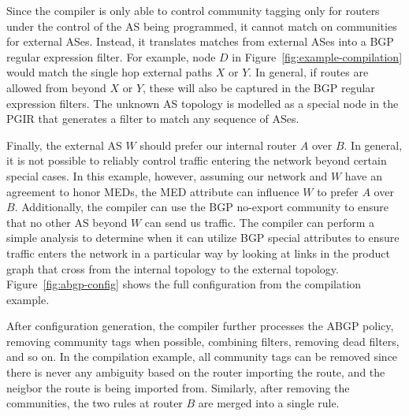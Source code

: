 \documentclass{sig-alternate-10pt}
\begin{document}
Since the compiler is only able to control community tagging only for routers under the control of the AS being programmed, it cannot match on communities for external ASes. Instead, it translates matches from external ASes into a BGP regular expression filter. For example, node $D$ in Figure~\ref{fig:example-compilation} would match the single hop external paths $X$ or $Y$. In general, if routes are allowed from beyond $X$ or $Y$, these will also be captured in the BGP regular expression filters. The unknown AS topology is modelled as a special node in the PGIR that generates a filter to match any sequence of ASes.

Finally, the external AS $W$ should prefer our internal router $A$ over $B$. In general, it is not possible to reliably control traffic entering the network beyond certain special cases. In this example, however, assuming our network and $W$ have an agreement to honor MEDs, the MED attribute can influence $W$ to prefer $A$ over $B$. Additionally, the compiler can use the BGP no-export community to ensure that no other AS beyond $W$ can send us traffic. The compiler can perform a simple analysis to determine when it can utilize BGP special attributes to ensure traffic enters the network in a particular way by looking at links in the product graph that cross from the internal topology to the external topology. 
Figure~\ref{fig:abgp-config} shows the full configuration from the compilation example. 

After configuration generation, the compiler further processes the ABGP policy, removing community tags when possible, combining filters, removing dead filters, and so on. In the compilation example, all community tags can be removed since there is never any ambiguity based on the router importing the route, and the neigbor the route is being imported from. Similarly, after removing the communities, the two rules at router $B$ are merged into a single rule.
\end{document}
